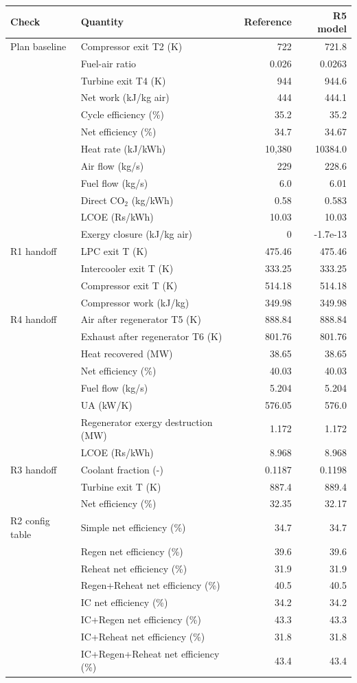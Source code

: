 \begin{tabular}{llrr}\toprule Check & Quantity & Reference & R5 model\\\midrule
Plan baseline & Compressor exit T2 (K) & 722 & 721.8\\
 & Fuel-air ratio & 0.026 & 0.0263\\
 & Turbine exit T4 (K) & 944 & 944.6\\
 & Net work (kJ/kg air) & 444 & 444.1\\
 & Cycle efficiency (\%) & 35.2 & 35.2\\
 & Net efficiency (\%) & 34.7 & 34.67\\
 & Heat rate (kJ/kWh) & 10,380 & 10384.0\\
 & Air flow (kg/s) & 229 & 228.6\\
 & Fuel flow (kg/s) & 6.0 & 6.01\\
 & Direct CO$_2$ (kg/kWh) & 0.58 & 0.583\\
 & LCOE (Rs/kWh) & 10.03 & 10.03\\
 & Exergy closure (kJ/kg air) & 0 & -1.7e-13\\
\addlinespace
R1 handoff & LPC exit T (K) & 475.46 & 475.46\\
 & Intercooler exit T (K) & 333.25 & 333.25\\
 & Compressor exit T (K) & 514.18 & 514.18\\
 & Compressor work (kJ/kg) & 349.98 & 349.98\\
\addlinespace
R4 handoff & Air after regenerator T5 (K) & 888.84 & 888.84\\
 & Exhaust after regenerator T6 (K) & 801.76 & 801.76\\
 & Heat recovered (MW) & 38.65 & 38.65\\
 & Net efficiency (\%) & 40.03 & 40.03\\
 & Fuel flow (kg/s) & 5.204 & 5.204\\
 & UA (kW/K) & 576.05 & 576.0\\
 & Regenerator exergy destruction (MW) & 1.172 & 1.172\\
 & LCOE (Rs/kWh) & 8.968 & 8.968\\
\addlinespace
R3 handoff & Coolant fraction (-) & 0.1187 & 0.1198\\
 & Turbine exit T (K) & 887.4 & 889.4\\
 & Net efficiency (\%) & 32.35 & 32.17\\
\addlinespace
R2 config table & Simple net efficiency (\%) & 34.7 & 34.7\\
 & Regen net efficiency (\%) & 39.6 & 39.6\\
 & Reheat net efficiency (\%) & 31.9 & 31.9\\
 & Regen+Reheat net efficiency (\%) & 40.5 & 40.5\\
 & IC net efficiency (\%) & 34.2 & 34.2\\
 & IC+Regen net efficiency (\%) & 43.3 & 43.3\\
 & IC+Reheat net efficiency (\%) & 31.8 & 31.8\\
 & IC+Regen+Reheat net efficiency (\%) & 43.4 & 43.4\\
\bottomrule\end{tabular}